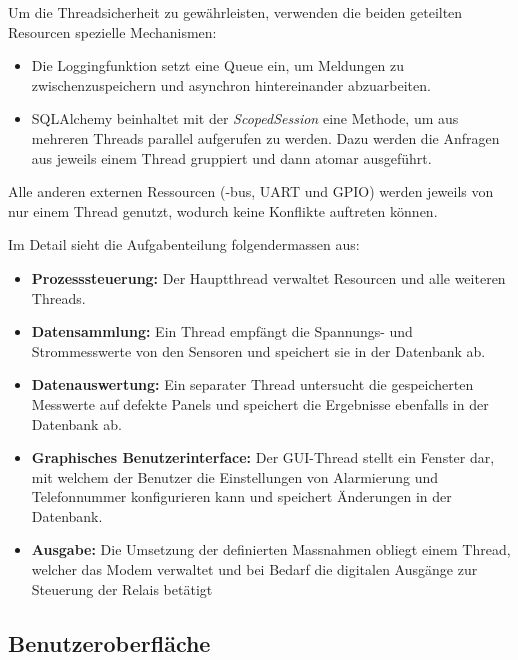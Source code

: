 Um  die Threadsicherheit  zu  gew\"ahrleisten, verwenden  die beiden  geteilten
Resourcen spezielle Mechanismen:
\begin{itemize}
    \tightlist
    \item
        Die   Loggingfunktion  setzt   eine   Queue  ein,   um  Meldungen   zu
        zwischenzuspeichern und asynchron hintereinander abzuarbeiten.
     \item
        SQLAlchemy beinhaltet  mit der  \emph{ScopedSession} eine  Methode, um
        aus  mehreren  Threads  parallel  aufgerufen  zu  werden. Dazu  werden
        die  Anfragen  aus jeweils  einem  Thread  gruppiert und  dann  atomar
        ausgef\"uhrt.
 \end{itemize}

Alle anderen externen Ressourcen (\ISC-bus,  UART und GPIO) werden jeweils von
nur einem Thread genutzt, wodurch keine Konflikte auftreten k\"onnen.

Im Detail sieht die Aufgabenteilung folgendermassen aus:
\begin{itemize}
    \tightlist
    \item
        \textbf{Prozesssteuerung:} Der  Hauptthread  verwaltet  Resourcen  und
        alle weiteren Threads.
    \item
        \textbf{Datensammlung:} Ein  Thread  empf\"angt   die  Spannungs-  und
        Strommesswerte von den Sensoren und speichert sie in der Datenbank ab.
    \item
        \textbf{Datenauswertung:} Ein   separater    Thread   untersucht   die
        gespeicherten  Messwerte   auf  defekte   Panels  und   speichert  die
        Ergebnisse ebenfalls in der Datenbank ab.
    \item
        \textbf{Graphisches  Benutzerinterface:} Der   GUI-Thread  stellt  ein
        Fenster  dar,   mit  welchem   der  Benutzer  die   Einstellungen  von
        Alarmierung  und   Telefonnummer  konfigurieren  kann   und  speichert
        \"Anderungen in der Datenbank.
    \item
        \textbf{Ausgabe:} Die  Umsetzung  der definierten  Massnahmen  obliegt
        einem Thread, welcher das Modem verwaltet und bei Bedarf die digitalen
        Ausg\"ange zur Steuerung der Relais bet\"atigt
\end{itemize}


\subsection{Benutzeroberfl\"ache}
\label{subsec:software:master:GUI}



